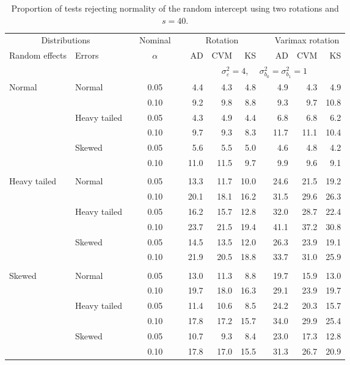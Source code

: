 \begin{table}[ht]
\centering
\caption{\label{tab:fixedsimb040} Proportion of tests rejecting normality of the random intercept using two rotations and $s = 40$.}
\begin{scriptsize}
\begin{tabular}{ll p{.1cm} c p{.1cm} rrr p{.1cm} rrr}
  \hline
  \multicolumn{2}{c}{Distributions}& & Nominal & &  \multicolumn{3}{c}{Rotation} & & \multicolumn{3}{c}{Varimax rotation} \\ \cline{1-2} \cline{6-8} \cline{10-12}   
  Random effects & Errors & & $\alpha$ & & AD & CVM & KS & & AD & CVM & KS \\ 
   \hline
& && && \multicolumn{7}{c}{$\sigma_{\varepsilon}^2 = 4$, \ \ $\sigma_{b_0}^2 = \sigma_{b_1}^2 = 1$} \\ \cline{6-12}
\rowcolor{gray!20} Normal & Normal &  & 0.05 &  & 4.4 & 4.3 & 4.8 &  & 4.9 & 4.3 & 4.9 \\ 
\rowcolor{gray!20}    &  &  & 0.10 &  & 9.2 & 9.8 & 8.8 &  & 9.3 & 9.7 & 10.8 \\ 
\rowcolor{gray!20}    & Heavy tailed &  & 0.05 &  & 4.3 & 4.9 & 4.4 &  & 6.8 & 6.8 & 6.2 \\ 
\rowcolor{gray!20}    &  &  & 0.10 &  & 9.7 & 9.3 & 8.3 &  & 11.7 & 11.1 & 10.4 \\ 
\rowcolor{gray!20}    & Skewed &  & 0.05 &  & 5.6 & 5.5 & 5.0 &  & 4.6 & 4.8 & 4.2 \\ 
\rowcolor{gray!20}    &  &  & 0.10 &  & 11.0 & 11.5 & 9.7 &  & 9.9 & 9.6 & 9.1 \\ 
&&&&&&&&&&&\\
  Heavy tailed & Normal &  & 0.05 &  & 13.3 & 11.7 & 10.0 &  & 24.6 & 21.5 & 19.2 \\ 
  &  &  & 0.10 &  & 20.1 & 18.1 & 16.2 &  & 31.5 & 29.6 & 26.3 \\ 
  & Heavy tailed &  & 0.05 &  & 16.2 & 15.7 & 12.8 &  & 32.0 & 28.7 & 22.4 \\ 
  &  &  & 0.10 &  & 23.7 & 21.5 & 19.4 &  & 41.1 & 37.2 & 30.8 \\ 
  & Skewed &  & 0.05 &  & 14.5 & 13.5 & 12.0 &  & 26.3 & 23.9 & 19.1 \\ 
  &  &  & 0.10 &  & 21.9 & 20.5 & 18.8 &  & 33.7 & 31.0 & 25.9 \\ 
&&&&&&&&&&&\\
  Skewed & Normal &  & 0.05 &  & 13.0 & 11.3 & 8.8 &  & 19.7 & 15.9 & 13.0 \\ 
  &  &  & 0.10 &  & 19.7 & 18.0 & 16.3 &  & 29.1 & 23.9 & 19.7 \\ 
  & Heavy tailed &  & 0.05 &  & 11.4 & 10.6 & 8.5 &  & 24.2 & 20.3 & 15.7 \\ 
  &  &  & 0.10 &  & 17.8 & 17.2 & 15.7 &  & 34.0 & 29.9 & 25.4 \\ 
  & Skewed &  & 0.05 &  & 10.7 & 9.3 & 8.4 &  & 23.0 & 17.3 & 12.8 \\ 
  &  &  & 0.10 &  & 17.8 & 17.0 & 15.5 &  & 31.3 & 26.7 & 20.9 \\ 


\end{tabular}
\end{scriptsize}
\end{table}
